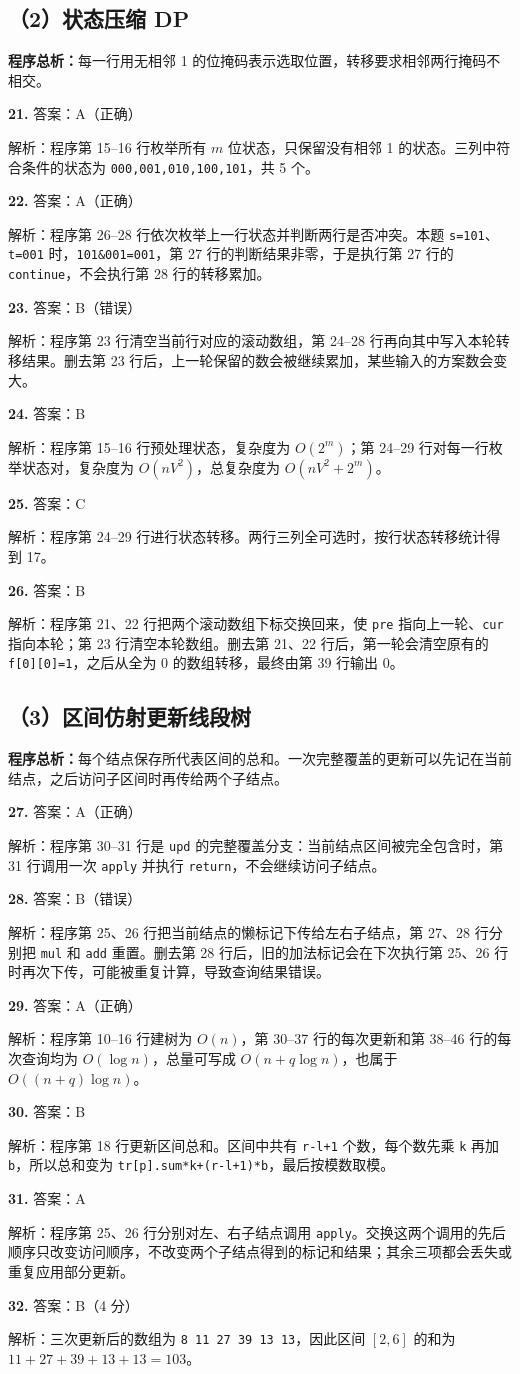 \documentclass[a4paper]{ctexart}
\newcommand{\ans}[2]{\noindent\textbf{#1} \quad 答案：#2\par}
\newcommand{\expn}[1]{\hspace*{1.5em}解析：#1\par}
\newcommand{\overview}[1]{\par\smallskip\noindent\textbf{程序总析：}#1\par\smallskip}
\begin{document}
\subsection*{（2）状态压缩 DP}
\overview{每一行用无相邻 1 的位掩码表示选取位置，转移要求相邻两行掩码不相交。}
\ans{21.}{A（正确）}\expn{程序第 15--16 行枚举所有 $m$ 位状态，只保留没有相邻 1 的状态。三列中符合条件的状态为 \texttt{000,001,010,100,101}，共 5 个。}
\ans{22.}{A（正确）}\expn{程序第 26--28 行依次枚举上一行状态并判断两行是否冲突。本题 \texttt{s=101}、\texttt{t=001} 时，\texttt{101\&001=001}，第 27 行的判断结果非零，于是执行第 27 行的 \texttt{continue}，不会执行第 28 行的转移累加。}
\ans{23.}{B（错误）}\expn{程序第 23 行清空当前行对应的滚动数组，第 24--28 行再向其中写入本轮转移结果。删去第 23 行后，上一轮保留的数会被继续累加，某些输入的方案数会变大。}
\ans{24.}{B}\expn{程序第 15--16 行预处理状态，复杂度为 $O(2^m)$；第 24--29 行对每一行枚举状态对，复杂度为 $O(nV^2)$，总复杂度为 $O(nV^2+2^m)$。}
\ans{25.}{C}\expn{程序第 24--29 行进行状态转移。两行三列全可选时，按行状态转移统计得到 17。}
\ans{26.}{B}\expn{程序第 21、22 行把两个滚动数组下标交换回来，使 \texttt{pre} 指向上一轮、\texttt{cur} 指向本轮；第 23 行清空本轮数组。删去第 21、22 行后，第一轮会清空原有的 \texttt{f[0][0]=1}，之后从全为 0 的数组转移，最终由第 39 行输出 0。}

\subsection*{（3）区间仿射更新线段树}
\overview{每个结点保存所代表区间的总和。一次完整覆盖的更新可以先记在当前结点，之后访问子区间时再传给两个子结点。}
\ans{27.}{A（正确）}\expn{程序第 30--31 行是 \texttt{upd} 的完整覆盖分支：当前结点区间被完全包含时，第 31 行调用一次 \texttt{apply} 并执行 \texttt{return}，不会继续访问子结点。}
\ans{28.}{B（错误）}\expn{程序第 25、26 行把当前结点的懒标记下传给左右子结点，第 27、28 行分别把 \texttt{mul} 和 \texttt{add} 重置。删去第 28 行后，旧的加法标记会在下次执行第 25、26 行时再次下传，可能被重复计算，导致查询结果错误。}
\ans{29.}{A（正确）}\expn{程序第 10--16 行建树为 $O(n)$，第 30--37 行的每次更新和第 38--46 行的每次查询均为 $O(\log n)$，总量可写成 $O(n+q\log n)$，也属于 $O((n+q)\log n)$。}
\ans{30.}{B}\expn{程序第 18 行更新区间总和。区间中共有 \texttt{r-l+1} 个数，每个数先乘 \texttt{k} 再加 \texttt{b}，所以总和变为 \texttt{tr[p].sum*k+(r-l+1)*b}，最后按模数取模。}
\ans{31.}{A}\expn{程序第 25、26 行分别对左、右子结点调用 \texttt{apply}。交换这两个调用的先后顺序只改变访问顺序，不改变两个子结点得到的标记和结果；其余三项都会丢失或重复应用部分更新。}
\ans{32.}{B（4 分）}\expn{三次更新后的数组为 \texttt{8 11 27 39 13 13}，因此区间 $[2,6]$ 的和为 $11+27+39+13+13=103$。}
\end{document}
